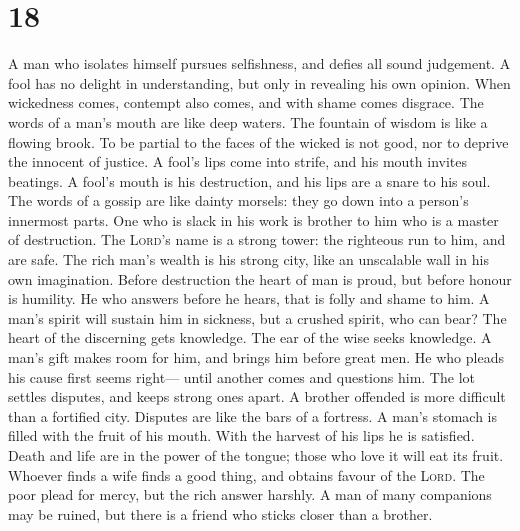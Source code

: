 \hypertarget{section-17}{%
\section{18}\label{section-17}}

 A man who isolates himself pursues selfishness, and
defies all sound judgement.  A fool has no delight in
understanding, but only in revealing his own opinion. 
When wickedness comes, contempt also comes, and with shame comes
disgrace.  The words of a man's mouth are like deep
waters. The fountain of wisdom is like a flowing brook. 
To be partial to the faces of the wicked is not good, nor to deprive the
innocent of justice.  A fool's lips come into strife, and
his mouth invites beatings.  A fool's mouth is his
destruction, and his lips are a snare to his soul.  The
words of a gossip are like dainty morsels: they go down into a person's
innermost parts.  One who is slack in his work is brother
to him who is a master of destruction.  The
\textsc{Lord}'s name is a strong tower: the righteous run to him, and
are safe.  The rich man's wealth is his strong city, like
an unscalable wall in his own imagination.  Before
destruction the heart of man is proud, but before honour is humility.
 He who answers before he hears, that is folly and shame
to him.  A man's spirit will sustain him in sickness, but
a crushed spirit, who can bear?  The heart of the
discerning gets knowledge. The ear of the wise seeks knowledge.
 A man's gift makes room for him, and brings him before
great men.  He who pleads his cause first seems right---
until another comes and questions him.  The lot settles
disputes, and keeps strong ones apart.  A brother
offended is more difficult than a fortified city. Disputes are like the
bars of a fortress.  A man's stomach is filled with the
fruit of his mouth. With the harvest of his lips he is satisfied.
 Death and life are in the power of the tongue; those who
love it will eat its fruit.  Whoever finds a wife finds a
good thing, and obtains favour of the \textsc{Lord}.  The
poor plead for mercy, but the rich answer harshly.  A man
of many companions may be ruined, but there is a friend who sticks
closer than a brother.

